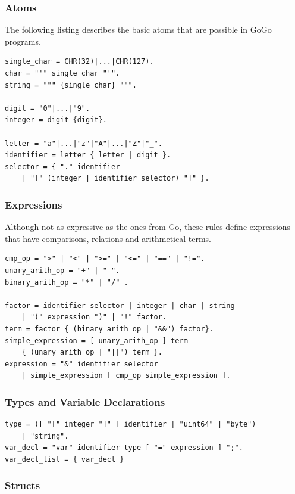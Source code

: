 \documentclass[a4paper]{scrartcl}
\let\subsection\subsubsection
\let\subsubsection\paragraph
\let\paragraph\subparagraph
\let\subparagraph\undefined
\begin{document}
      \subsection*{Atoms}
        The following listing describes the basic atoms that are possible in 
        GoGo programs.
        \begin{lstlisting}[caption=Atoms]
single_char = CHR(32)|...|CHR(127).
char = "'" single_char "'".
string = """ {single_char} """.

digit = "0"|...|"9".	
integer = digit {digit}.

letter = "a"|...|"z"|"A"|...|"Z"|"_".
identifier = letter { letter | digit }.
selector = { "." identifier 
    | "[" (integer | identifier selector) "]" }.
        \end{lstlisting}

      \subsection*{Expressions}
        Although not as expressive as the ones from Go, these rules define expressions that have comparisons, relations and arithmetical terms. 

        \begin{lstlisting}[caption=Expressions]
cmp_op = ">" | "<" | ">=" | "<=" | "==" | "!=".
unary_arith_op = "+" | "-".
binary_arith_op = "*" | "/" .

factor = identifier selector | integer | char | string 
    | "(" expression ")" | "!" factor.	
term = factor { (binary_arith_op | "&&") factor}.
simple_expression = [ unary_arith_op ] term 
    { (unary_arith_op | "||") term }.
expression = "&" identifier selector 
    | simple_expression [ cmp_op simple_expression ].
        \end{lstlisting}

      \subsection*{Types and Variable Declarations}

        \begin{lstlisting}[caption=Types]
type = ([ "[" integer "]" ] identifier | "uint64" | "byte") 
    | "string".
var_decl = "var" identifier type [ "=" expression ] ";".
var_decl_list = { var_decl }
        \end{lstlisting}

      \subsection*{Structs}
\end{document}
